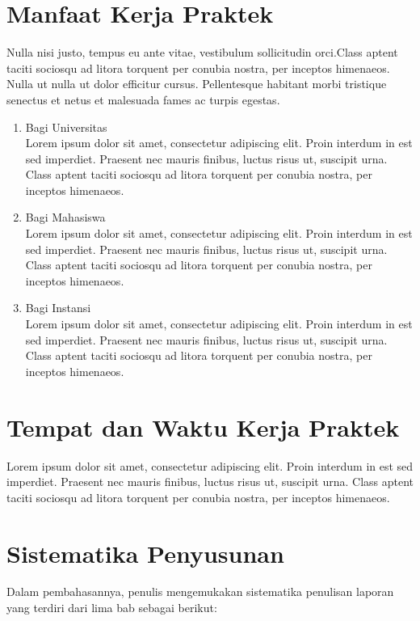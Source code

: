 \section{Manfaat Kerja Praktek}
Nulla nisi justo, tempus eu ante vitae, vestibulum sollicitudin orci.Class aptent taciti sociosqu ad litora torquent per conubia nostra, per inceptos himenaeos. Nulla ut nulla ut dolor efficitur cursus. Pellentesque habitant morbi tristique senectus et netus et malesuada fames ac turpis egestas.
\begin{enumerate}
      \item Bagi Universitas \\
            Lorem ipsum dolor sit amet, consectetur adipiscing elit. Proin interdum in est sed imperdiet. Praesent nec mauris finibus, luctus risus ut, suscipit urna. Class aptent taciti sociosqu ad litora torquent per conubia nostra, per inceptos himenaeos.
      \item Bagi Mahasiswa \\
            Lorem ipsum dolor sit amet, consectetur adipiscing elit. Proin interdum in est sed imperdiet. Praesent nec mauris finibus, luctus risus ut, suscipit urna. Class aptent taciti sociosqu ad litora torquent per conubia nostra, per inceptos himenaeos.
      \item Bagi Instansi \\
            Lorem ipsum dolor sit amet, consectetur adipiscing elit. Proin interdum in est sed imperdiet. Praesent nec mauris finibus, luctus risus ut, suscipit urna. Class aptent taciti sociosqu ad litora torquent per conubia nostra, per inceptos himenaeos.
\end{enumerate}

\section{Tempat dan Waktu Kerja Praktek}

Lorem ipsum dolor sit amet, consectetur adipiscing elit. Proin interdum in est sed imperdiet. Praesent nec mauris finibus, luctus risus ut, suscipit urna. Class aptent taciti sociosqu ad litora torquent per conubia nostra, per inceptos himenaeos.


\section{Sistematika Penyusunan}

Dalam pembahasannya, penulis mengemukakan sistematika penulisan laporan yang terdiri dari lima bab sebagai berikut:


